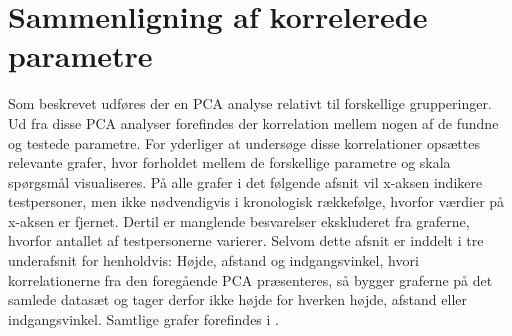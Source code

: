 \section{Sammenligning af korrelerede parametre}
\label{DatabehandlingSammenligningKorrelerede}
%
Som beskrevet udføres der en PCA analyse relativt til forskellige grupperinger. Ud fra disse PCA analyser forefindes der korrelation mellem nogen af de fundne og testede parametre. For yderliger at undersøge disse korrelationer opsættes relevante grafer, hvor forholdet mellem de forskellige parametre og skala spørgsmål visualiseres. På alle grafer i det følgende afsnit vil x-aksen indikere testpersoner, men ikke nødvendigvis i kronologisk rækkefølge, hvorfor værdier på x-aksen er fjernet. Dertil er manglende besvarelser ekskluderet fra graferne, hvorfor antallet af testpersonerne varierer. Selvom dette afsnit er inddelt i tre underafsnit for henholdvis: Højde, afstand og indgangsvinkel, hvori korrelationerne fra den foregående PCA præsenteres, så bygger graferne på det samlede datasæt og tager derfor ikke højde for hverken højde, afstand eller indgangsvinkel. Samtlige grafer forefindes i . 

